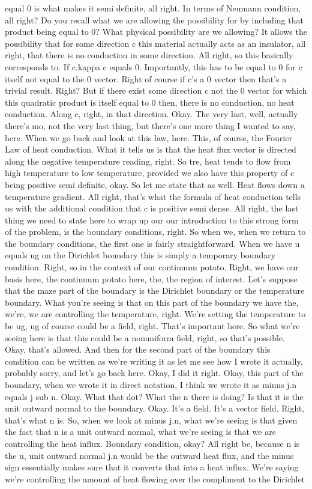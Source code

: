 \documentclass[10pt]{article}
\begin{document}
equal 0 is what makes it semi definite, all right. In terms of Neumann condition, all right? Do you recall what we are allowing the possibility for by including that product being equal to 0? What physical possibility are we allowing? It allows the possibility that for some direction c this material actually acts as an insulator, all right, that there is no conduction in some direction. All right, so this basically corresponds to. If c.kappa c equals 0. Importantly, this has to be equal to 0 for c itself not equal to the 0 vector. Right of course if c's a 0 vector then that's a trivial result. Right? But if there exist some direction c not the 0 vector for which this quadratic product is itself equal to 0 then, there is no conduction, no heat conduction. Along c, right, in that direction. Okay. The very last, well, actually there's mo, not the very last thing, but there's one more thing I wanted to say, here. When we go back and look at this law, here. This, of course, the Fourier Law of heat conduction. What it tells us is that the heat flux vector is directed along the negative temperature reading, right. So tre, heat tends to flow from high temperature to low temperature, provided we also have this property of c being positive semi definite, okay. So let me state that as well. Heat flows down a temperature gradient. All right, that's what the formula of heat conduction tells us with the additional condition that c is positive semi dense. All right, the last thing we need to state here to wrap up our our introduction to this strong form of the problem, is the boundary conditions, right. So when we, when we return to the boundary conditions, the first one is fairly straightforward. When we have u equals ug on the Dirichlet boundary this is simply a temporary boundary condition. Right, so in the context of our continuum potato. Right, we have our basis here, the continuum potato here, the, the region of interest. Let's suppose that the maze part of the boundary is the Dirichlet boundary or the temperature boundary. What you're seeing is that on this part of the boundary we have the, we're, we are controlling the temperature, right. We're setting the temperature to be ug, ug of course could be a field, right. That's important here. So what we're seeing here is that this could be a nonuniform field, right, so that's possible. Okay, that's allowed. And then for the second part of the boundary this condition can be written as we're writing it as let me see how I wrote it actually, probably sorry, and let's go back here. Okay, I did it right. Okay, this part of the boundary, when we wrote it in direct notation, I think we wrote it as minus j.n equals j sub n. Okay. What that dot? What the n there is doing? Is that it is the unit outward normal to the boundary. Okay. It's a field. It's a vector field. Right, that's what n is. So, when we look at minus j.n, what we're seeing is that given the fact that n is a unit outward normal, what we're seeing is that we are controlling the heat influx. Boundary condition, okay? All right be, because n is the u, unit outward normal j.n would be the outward heat flux, and the minus sign essentially makes sure that it converts that into a heat influx. We're saying we're controlling the amount of heat flowing over the compliment to the Dirichlet 
\end{document}
